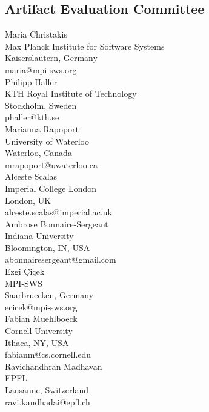 \documentclass[a4paper,UKenglish]{dartsmaster}
\begin{document}
\begin{participants}

\chapter[Committee]{Artifact Evaluation Committee}
\participant Maria Christakis \\
Max Planck Institute for Software Systems \\
Kaiserslautern, Germany\\ 
maria@mpi-sws.org\\

\participant Philipp Haller\\
KTH Royal Institute of Technology\\
Stockholm, Sweden\\ 
phaller@kth.se\\

\participant Marianna Rapoport\\
University of Waterloo\\
Waterloo, Canada\\
mrapoport@uwaterloo.ca\\

\participant	Alceste Scalas	\\	Imperial College London	\\	London, UK	\\	alceste.scalas@imperial.ac.uk	\\

\participant	Ambrose Bonnaire-Sergeant	\\	Indiana University	\\	Bloomington, IN, USA	\\	abonnairesergeant@gmail.com	\\

\participant	Ezgi Çiçek	\\	MPI-SWS	\\	Saarbruecken, Germany	\\	ecicek@mpi-sws.org	\\

\participant	Fabian Muehlboeck	\\	Cornell University	\\	Ithaca, NY, USA	\\	fabianm@cs.cornell.edu	\\

\participant	Ravichandhran Madhavan	\\	EPFL	\\	Lausanne, Switzerland	\\	ravi.kandhadai@epfl.ch	\\


\end{participants}
\end{document}
